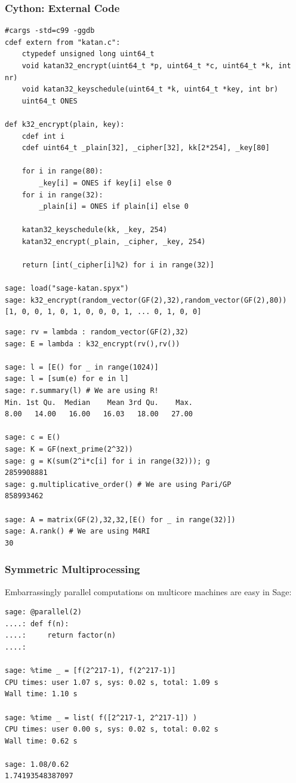 \documentclass[9pt]{beamer}
\begin{document}
\begin{frame}
\frametitle{Cython: External Code}
\begin{lstlisting}
#cargs -std=c99 -ggdb
cdef extern from "katan.c":
    ctypedef unsigned long uint64_t
    void katan32_encrypt(uint64_t *p, uint64_t *c, uint64_t *k, int nr)
    void katan32_keyschedule(uint64_t *k, uint64_t *key, int br)
    uint64_t ONES

def k32_encrypt(plain, key):
    cdef int i
    cdef uint64_t _plain[32], _cipher[32], kk[2*254], _key[80]

    for i in range(80):
        _key[i] = ONES if key[i] else 0
    for i in range(32):
        _plain[i] = ONES if plain[i] else 0

    katan32_keyschedule(kk, _key, 254)
    katan32_encrypt(_plain, _cipher, _key, 254)

    return [int(_cipher[i]%2) for i in range(32)]

sage: load("sage-katan.spyx")
sage: k32_encrypt(random_vector(GF(2),32),random_vector(GF(2),80))
[1, 0, 0, 1, 0, 1, 0, 0, 0, 1, ... 0, 1, 0, 0]
\end{lstlisting}

\framebreak


\begin{lstlisting}
sage: rv = lambda : random_vector(GF(2),32)
sage: E = lambda : k32_encrypt(rv(),rv())

sage: l = [E() for _ in range(1024)]
sage: l = [sum(e) for e in l]
sage: r.summary(l) # We are using R!
Min. 1st Qu.  Median    Mean 3rd Qu.    Max.
8.00   14.00   16.00   16.03   18.00   27.00

sage: c = E()
sage: K = GF(next_prime(2^32))
sage: g = K(sum(2^i*c[i] for i in range(32))); g
2859908881
sage: g.multiplicative_order() # We are using Pari/GP
858993462

sage: A = matrix(GF(2),32,32,[E() for _ in range(32)])
sage: A.rank() # We are using M4RI
30
\end{lstlisting}


\end{frame}


\begin{frame}[fragile]
\frametitle{Symmetric Multiprocessing}

Embarrassingly parallel computations on multicore machines are easy in Sage:

\begin{lstlisting}
sage: @parallel(2)
....: def f(n):
....:     return factor(n)
....:

sage: %time _ = [f(2^217-1), f(2^217-1)]
CPU times: user 1.07 s, sys: 0.02 s, total: 1.09 s
Wall time: 1.10 s

sage: %time _ = list( f([2^217-1, 2^217-1]) )
CPU times: user 0.00 s, sys: 0.02 s, total: 0.02 s
Wall time: 0.62 s

sage: 1.08/0.62
1.74193548387097
\end{lstlisting}
\end{frame}
\end{document}
